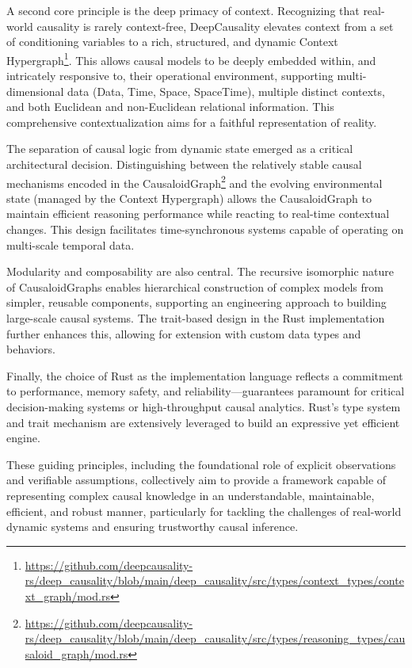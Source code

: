 A second core principle is the deep primacy of context. Recognizing that real-world causality is rarely context-free, DeepCausality elevates context from a set of conditioning variables to a rich, structured, and dynamic Context Hypergraph\footnote{\url{https://github.com/deepcausality-rs/deep_causality/blob/main/deep_causality/src/types/context_types/context_graph/mod.rs}}. This allows causal models to be deeply embedded within, and intricately responsive to, their operational environment, supporting multi-dimensional data (Data, Time, Space, SpaceTime), multiple distinct contexts, and both Euclidean and non-Euclidean relational information. This comprehensive contextualization aims for a faithful representation of reality.

The separation of causal logic from dynamic state emerged as a critical architectural decision. Distinguishing between the relatively stable causal mechanisms encoded in the CausaloidGraph\footnote{\url{https://github.com/deepcausality-rs/deep_causality/blob/main/deep_causality/src/types/reasoning_types/causaloid_graph/mod.rs}} and the evolving environmental state (managed by the Context Hypergraph) allows the CausaloidGraph to maintain efficient reasoning performance while reacting to real-time contextual changes. This design facilitates time-synchronous systems capable of operating on multi-scale temporal data.

Modularity and composability are also central. The recursive isomorphic nature of CausaloidGraphs enables hierarchical construction of complex models from simpler, reusable components, supporting an engineering approach to building large-scale causal systems. The trait-based design in the Rust implementation further enhances this, allowing for extension with custom data types and behaviors.

Finally, the choice of Rust as the implementation language reflects a commitment to performance, memory safety, and reliability—guarantees paramount for critical decision-making systems or high-throughput causal analytics. Rust's type system and trait mechanism are extensively leveraged to build an expressive yet efficient engine.

These guiding principles, including the foundational role of explicit observations and verifiable assumptions, collectively aim to provide a framework capable of representing complex causal knowledge in an understandable, maintainable, efficient, and robust manner, particularly for tackling the challenges of real-world dynamic systems and ensuring trustworthy causal inference.

